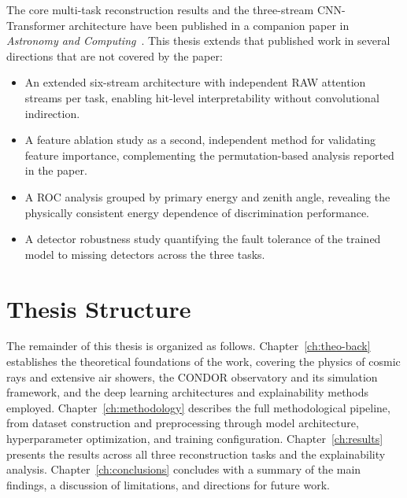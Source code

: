 The core multi-task reconstruction results and the three-stream CNN-Transformer architecture have been published in a companion paper in \emph{Astronomy and Computing}~. This thesis extends that published work in several directions that are not covered by the paper:
\begin{itemize}
    \item An extended six-stream architecture with independent RAW attention streams per task, enabling hit-level interpretability without convolutional indirection.
    \item A feature ablation study as a second, independent method for validating feature importance, complementing the permutation-based analysis reported in the paper.
    \item A ROC analysis grouped by primary energy and zenith angle, revealing the physically consistent energy dependence of discrimination performance.
    \item A detector robustness study quantifying the fault tolerance of the trained model to missing detectors across the three tasks.
\end{itemize}

\section{Thesis Structure}

The remainder of this thesis is organized as follows. Chapter~\ref{ch:theo-back} establishes the theoretical foundations of the work, covering the physics of cosmic rays and extensive air showers, the CONDOR observatory and its simulation framework, and the deep learning architectures and explainability methods employed. Chapter~\ref{ch:methodology} describes the full methodological pipeline, from dataset construction and preprocessing through model architecture, hyperparameter optimization, and training configuration. Chapter~\ref{ch:results} presents the results across all three reconstruction tasks and the explainability analysis. Chapter~\ref{ch:conclusions} concludes with a summary of the main findings, a discussion of limitations, and directions for future work.